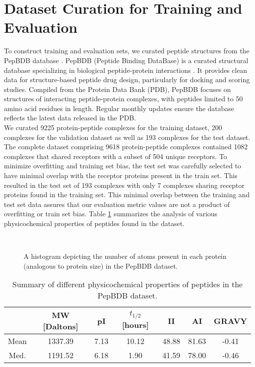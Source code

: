 \section{Dataset Curation for Training and Evaluation}
To construct training and evaluation sets, we curated peptide structures from the PepBDB database \cite{Wen2019}. PepBDB (Peptide Binding DataBase) is a curated structural database specializing in biological peptide-protein interactions \cite{Wen2019}. It provides clean data for structure-based peptide drug design, particularly for docking and scoring studies. Compiled from the Protein Data Bank (PDB), PepBDB focuses on structures of interacting peptide-protein complexes, with peptides limited to 50 amino acid residues in length. Regular monthly updates ensure the database reflects the latest data released in the PDB. \\

We curated 9225 protein-peptide complexes for the training dataset, 200 complexes for the validation dataset as well as 193 complexes for the test dataset. The complete dataset comprising 9618 protein-peptide complexes contained 1082 complexes that shared receptors with a subset of 504 unique receptors. To minimize overfitting and training set bias, the test set was carefully selected to have minimal overlap with the receptor proteins present in the train set. This resulted in the test set of 193 complexes with only 7 complexes sharing receptor proteins found in the training set. This minimal overlap between the training and test set data assures that our evaluation metric values are not a product of overfitting or train set bias. Table \ref{tab:pepbdb_pc_metrics} summarizes the analysis of various physicochemical properties of peptides found in the dataset. \\
\begin{figure}
  \center

   \\

  \caption{A histogram depicting the number of atoms present in each protein (analogous to protein size) in the PepBDB dataset.}

  \label{fig:residue_count}
\end{figure}

\begin{table}[ht]
\centering
\renewcommand{\arraystretch}{1.5}
\begin{tabular}{|c|c|c|c|c|c|c|}
      \hline
      & \multicolumn{1}{c|}{MW [Daltons]} & \multicolumn{1}{c|}{pI} & \multicolumn{1}{c|}{$t_{1/2}$ [hours]} & \multicolumn{1}{c|}{II} & \multicolumn{1}{c|}{AI} & \multicolumn{1}{c|}{GRAVY}\\
      \hline
      Mean          & 1337.39 & 7.13 & 10.12 & 48.88 & 81.63 & -0.41 \\
      Med.          & 1191.52 & 6.18 & 1.90 & 41.59 & 78.00 & -0.46 \\
      \hline
\end{tabular}
\renewcommand{\arraystretch}{1}
\caption{Summary of different physicochemical properties of peptides in the PepBDB dataset.}
\label{tab:pepbdb_pc_metrics}
\end{table}

